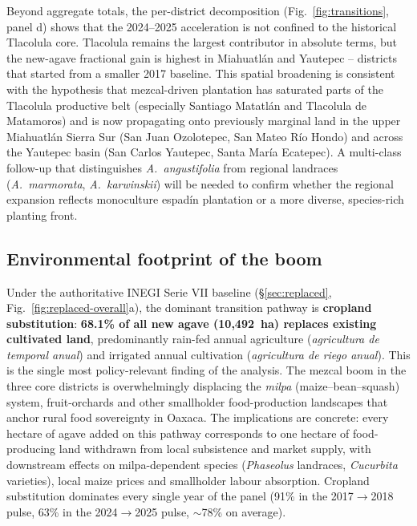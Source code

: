 \documentclass[10pt,a4paper]{article}
\begin{document}
Beyond aggregate totals, the per-district decomposition
(Fig.~\ref{fig:transitions}, panel d) shows that the 2024--2025
acceleration is not confined to the historical Tlacolula core.
Tlacolula remains the largest contributor in absolute terms, but
the new-agave fractional gain is highest in Miahuatlán and
Yautepec -- districts that started from a smaller 2017 baseline.
This spatial broadening is consistent with the hypothesis that
mezcal-driven plantation has saturated parts of the Tlacolula
productive belt (especially Santiago Matatlán and Tlacolula de
Matamoros) and is now propagating onto previously marginal land
in the upper Miahuatlán Sierra Sur (San Juan Ozolotepec, San
Mateo Río Hondo) and across the Yautepec basin (San Carlos
Yautepec, Santa María Ecatepec). A multi-class follow-up that
distinguishes \textit{A.\ angustifolia} from regional landraces
(\textit{A.\ marmorata}, \textit{A.\ karwinskii}) will be needed
to confirm whether the regional expansion reflects monoculture
espad\'in plantation or a more diverse, species-rich planting
front.

\subsection{Environmental footprint of the boom}

Under the authoritative INEGI Serie VII baseline
(\S\ref{sec:replaced}, Fig.~\ref{fig:replaced-overall}a), the
dominant transition pathway is \textbf{cropland substitution}:
\textbf{68.1\% of all new agave (10{,}492~ha) replaces existing
cultivated land}, predominantly rain-fed annual agriculture
(\textit{agricultura de temporal anual}) and irrigated annual
cultivation (\textit{agricultura de riego anual}). This is the
single most policy-relevant finding of the analysis. The mezcal
boom in the three core districts is overwhelmingly displacing
the \textit{milpa} (maize--bean--squash) system, fruit-orchards
and other smallholder food-production landscapes that anchor
rural food sovereignty in Oaxaca. The implications are concrete:
every hectare of agave added on this pathway corresponds to one
hectare of food-producing land withdrawn from local subsistence
and market supply, with downstream effects on milpa-dependent
species (\textit{Phaseolus} landraces, \textit{Cucurbita}
varieties), local maize prices and smallholder labour absorption.
Cropland substitution dominates every single year of the panel
(91\% in the 2017$\to$2018 pulse, 63\% in the 2024$\to$2025
pulse, $\sim$78\% on average).
\end{document}
